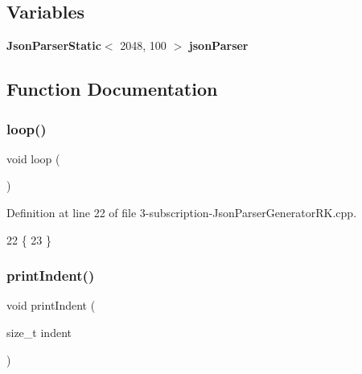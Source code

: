 \subsection*{Variables}
\begin{DoxyCompactItemize}
\item 
\textbf{ Json\+Parser\+Static}$<$ 2048, 100 $>$ \textbf{ json\+Parser}
\end{DoxyCompactItemize}


\subsection{Function Documentation}
\mbox{\label{3-subscription-_json_parser_generator_r_k_8cpp_afe461d27b9c48d5921c00d521181f12f}} 
\subsubsection{loop()}
{\footnotesize\ttfamily void loop (\begin{DoxyParamCaption}{ }\end{DoxyParamCaption})}



Definition at line 22 of file 3-\/subscription-\/\+Json\+Parser\+Generator\+R\+K.\+cpp.


\begin{DoxyCode}
22             \{
23 \}
\end{DoxyCode}
\mbox{\label{3-subscription-_json_parser_generator_r_k_8cpp_ae269cd10672ea800dd6fd6f14e48d0f8}} 
\subsubsection{print\+Indent()}
{\footnotesize\ttfamily void print\+Indent (\begin{DoxyParamCaption}\item[{size\+\_\+t}]{indent }\end{DoxyParamCaption})}




